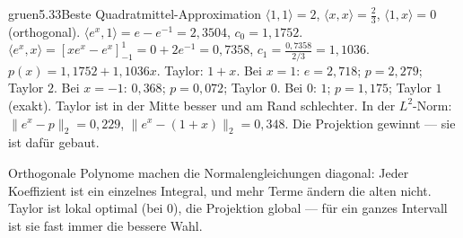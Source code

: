 \begin{loesungkarte}{gruen}{5.33}{Beste Quadratmittel-Approximation}
$\langle1, 1\rangle = 2$, $\langle x, x\rangle = \frac23$, $\langle1, x\rangle = 0$ (orthogonal). $\langle e^{x}, 1\rangle = e - e^{-1} = 2{,}3504$, $c_0 = 1{,}1752$. $\langle e^{x}, x\rangle = [xe^{x} - e^{x}]_{-1}^{1} = 0 + 2e^{-1} = 0{,}7358$, $c_1 = \frac{0{,}7358}{2/3} = 1{,}1036$.
$p(x) = 1{,}1752 + 1{,}1036x$. Taylor: $1 + x$.
Bei $x = 1$: $e = 2{,}718$; $p = 2{,}279$; Taylor $2$. Bei $x = -1$: $0{,}368$; $p = 0{,}072$; Taylor $0$. Bei $0$: $1$; $p = 1{,}175$; Taylor $1$ (exakt). Taylor ist in der Mitte besser und am Rand schlechter. In der $L^{2}$-Norm: $\|e^{x} - p\|_2 = 0{,}229$, $\|e^{x} - (1 + x)\|_2 = 0{,}348$. Die Projektion gewinnt --- sie ist dafür gebaut.
\begin{mitnehmen}\kastentext
Orthogonale Polynome machen die Normalengleichungen diagonal: Jeder Koeffizient ist ein einzelnes Integral, und mehr Terme ändern die alten nicht. Taylor ist lokal optimal (bei $0$), die Projektion global --- für ein ganzes Intervall ist sie fast immer die bessere Wahl.
\end{mitnehmen}
\end{loesungkarte}

